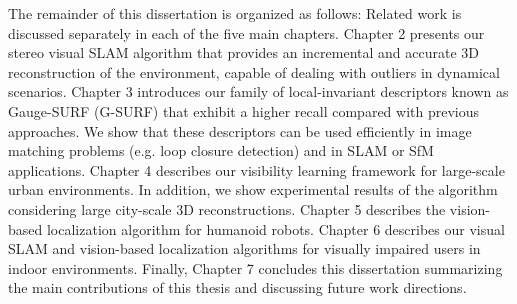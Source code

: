 The remainder of this dissertation is organized as follows: Related work is discussed separately
in each of the five main chapters. Chapter 2 presents our stereo visual SLAM
algorithm that provides an incremental and accurate 3D reconstruction of the environment,
capable of dealing with outliers in dynamical scenarios. Chapter 3 introduces our
family of local-invariant descriptors known as Gauge-SURF (G-SURF) that exhibit a
higher recall compared with previous approaches. We show that these descriptors can be
used efficiently in image matching problems (e.g. loop closure detection) and in SLAM
or SfM applications. Chapter 4 describes our visibility learning framework for large-scale
urban environments. In addition, we show experimental results of the algorithm considering
large city-scale 3D reconstructions. Chapter 5 describes the vision-based localization
algorithm for humanoid robots. Chapter 6 describes our visual SLAM and vision-based
localization algorithms for visually impaired users in indoor environments. Finally, Chapter
7 concludes this dissertation summarizing the main contributions of this thesis and
discussing future work directions.


